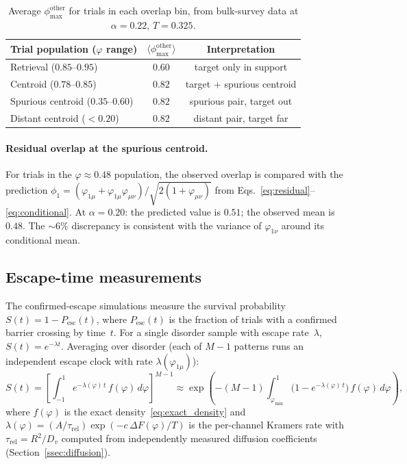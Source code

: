 \documentclass[11pt]{article}
\newcommand{\avg}[1]{\langle #1 \rangle}
\begin{document}
\begin{table}[h]
\centering
\caption{Average $\phi_{\max}^{\mathrm{other}}$ for trials in each overlap bin, from bulk-survey data at $\alpha = 0.22$, $T = 0.325$.}
\label{tab:phimax}
\begin{tabular}{lcc}
\toprule
Trial population ($\varphi$ range) & $\avg{\phi_{\max}^{\mathrm{other}}}$ & Interpretation \\
\midrule
Retrieval ($0.85$--$0.95$) & $0.60$ & target only in support \\
Centroid ($0.78$--$0.85$) & $0.82$ & target + spurious centroid \\
Spurious centroid ($0.35$--$0.60$) & $0.82$ & spurious pair, target out \\
Distant centroid ($< 0.20$) & $0.82$ & distant pair, target far \\
\bottomrule
\end{tabular}
\end{table}

\paragraph{Residual overlap at the spurious centroid.}
For trials in the $\varphi \approx 0.48$ population, the observed overlap is compared with the prediction $\phi_1 = (\varphi_{1\mu} + \varphi_{1\mu}\varphi_{\mu\nu})/\sqrt{2(1+\varphi_{\mu\nu})}$ from Eqs.~\eqref{eq:residual}--\eqref{eq:conditional}.  At $\alpha = 0.20$: the predicted value is $0.51$; the observed mean is $0.48$.  The $\sim 6\%$ discrepancy is consistent with the variance of $\varphi_{1\nu}$ around its conditional mean.

\subsection{Escape-time measurements}
\label{ssec:escape_times}

The confirmed-escape simulations measure the survival probability $S(t) = 1 - P_{\mathrm{esc}}(t)$, where $P_{\mathrm{esc}}(t)$ is the fraction of trials with a confirmed barrier crossing by time~$t$.  For a single disorder sample with escape rate~$\lambda$, $S(t) = e^{-\lambda t}$.  Averaging over disorder (each of $M-1$ patterns runs an independent escape clock with rate $\lambda(\varphi_{1\mu})$):
\begin{equation}
S(t) = \left[\int_{-1}^{1} e^{-\lambda(\varphi)\,t}\,f(\varphi)\,d\varphi\right]^{M-1}
\approx \exp\!\left(-(M{-}1)\int_{\varphi_{\min}}^{1}\!\bigl(1 - e^{-\lambda(\varphi)\,t}\bigr)\,f(\varphi)\,d\varphi\right),
\label{eq:compound_poisson}
\end{equation}
where $f(\varphi)$ is the exact density~\eqref{eq:exact_density} and $\lambda(\varphi) = (A/\tau_{\mathrm{rel}})\exp(-c\,\Delta F(\varphi)/T)$ is the per-channel Kramers rate with $\tau_{\mathrm{rel}} = R^2/D_v$ computed from independently measured diffusion coefficients (Section~\ref{ssec:diffusion}).
\end{document}
